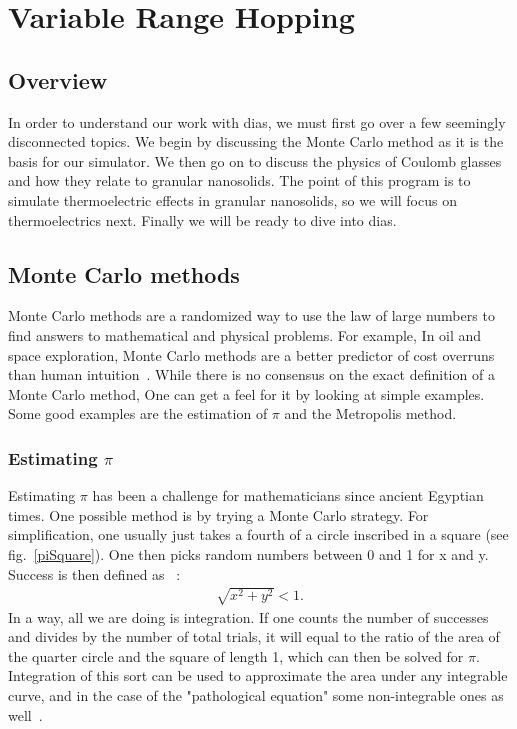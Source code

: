 \chapter{Variable Range Hopping}		%
\label{theorychap}

\section{Overview}
In order to understand our work with {\sc dias}, we must first go over a few seemingly disconnected topics. We begin by discussing the Monte Carlo method as it is the basis for our simulator. We then go on to discuss the physics of Coulomb glasses and how they relate to granular nanosolids. The point of this program is to simulate thermoelectric effects in granular nanosolids, so we will focus on thermoelectrics next. Finally we will be ready to dive into {\sc dias}.

\section{Monte Carlo methods}
Monte Carlo methods are a randomized way to use the law of large numbers to find answers to mathematical and physical problems. For example, In oil and space exploration, Monte Carlo methods are a better predictor of cost overruns than human intuition~\cite{Hubbard09}. While there is no consensus on the exact definition of a Monte Carlo method, One can get a feel for it by looking at simple examples. Some good examples are the estimation of $\pi$ and the Metropolis method.

\subsection{Estimating $\pi$}
Estimating $\pi$ has been a challenge for mathematicians since ancient Egyptian times. One possible method is by trying a Monte Carlo strategy. For simplification, one usually just takes a fourth of a circle inscribed in a square (see fig.~\ref{piSquare}). One then picks random numbers between 0 and 1 for x and y. Success is then defined as ~\cite{Kalos08}:
\begin{eqnarray}
\sqrt{x^2 + y^2} < 1 .
\label{piSuccess}
\end{eqnarray}
In a way, all we are doing is integration. If one counts the number of successes and divides by the number of total trials, it will equal to the ratio of the area of the quarter circle and the square of length 1, which can then be solved for $\pi$. Integration of this sort can be used to approximate the area under any integrable curve, and in the case of the "pathological equation" some non-integrable ones as well~\cite{Newmann99}.

